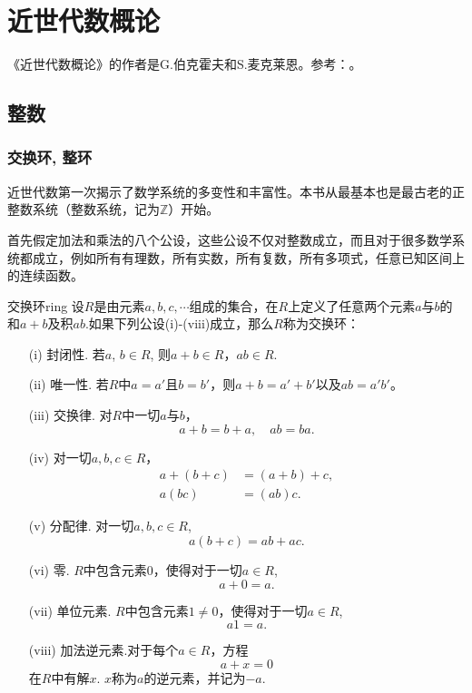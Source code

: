 \chapter{近世代数概论}
《近世代数概论》的作者是G.伯克霍夫和S.麦克莱恩。参考：\cite{surveyofmodernalgebra1979}。

\section{整数}\label{section001}

\subsection{交换环, 整环}\label{subsection0010101}
近世代数第一次揭示了数学系统的多变性和丰富性。本书从最基本也是最古老的正整数系统（整数系统，记为$\mathbb{Z}$）开始。

首先假定加法和乘法的八个公设，这些公设不仅对整数成立，而且对于很多数学系统都成立，例如所有有理数，所有实数，所有复数，所有多项式，任意已知区间上的连续函数。

\begin{definition}{交换环}{ring} 
设$R$是由元素$a,b,c,\cdots$组成的集合，在$R$上定义了任意两个元素$a$与$b$的和$a+b$及积$ab$.如果下列公设(i)-(viii)成立，那么$R$称为交换环：
\begin{enumerate}
\item[(i)] 封闭性. 若$a$, $b \in R$, 则$a+b \in R$，$ab \in R$.
\item[(ii)] 唯一性. 若$R$中$a=a'$且$b=b'$，则$a+b=a'+b'$以及$ab=a'b'$。
\item[(iii)]交换律. 对$R$中一切$a$与$b$，
\[
a+b=b+a,\quad ab=ba.
\]
\item[(iv)]对一切$a,b,c \in R$，
\[
\begin{aligned}
a + (b + c) &= (a+b)+c, \\
a(bc) &= (ab)c.
\end{aligned}
\]
\item[(v)]分配律. 对一切$a,b,c \in R$,
\[
a(b + c)=ab + ac. 
\]
\item[(vi)]零. $R$中包含元素$0$，使得对于一切$a \in R$, 
\[
a + 0 = a.
\]
\item[(vii)]单位元素. $R$中包含元素$1 \neq 0$，使得对于一切$a \in R$,
\[
a1=a.
\]
\item[(viii)]加法逆元素.对于每个$a \in R$，方程
\[
a + x = 0
\]
在$R$中有解$x$. $x$称为$a$的逆元素，并记为$-a$.
\end{enumerate}
\end{definition}

